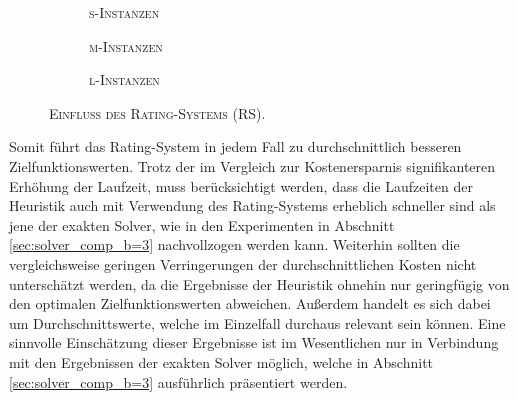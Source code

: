 \begin{figure}[H]
\centering
\begin{subfigure}[b]{0.325\textwidth}
\centering
{}
\caption{\textsc{s-Instanzen}}
\label{fig:rs_impact_a}
\end{subfigure}
\begin{subfigure}[b]{0.325\textwidth}
\centering
{}
\caption{\textsc{m-Instanzen}}
\label{fig:rs_impact_b}
\end{subfigure}
\begin{subfigure}[b]{0.325\textwidth}
\centering
{}
\caption{\textsc{l-Instanzen}}
\label{fig:rs_impact_c}
\end{subfigure}
\caption{\textsc{Einfluss des Rating-Systems (RS).}}
\label{fig:impact_of_rating_system}
\end{figure}

Somit führt das Rating-System in jedem Fall zu durchschnittlich besseren Zielfunktionswerten.
Trotz der im Vergleich zur Kostenersparnis signifikanteren Erhöhung der Laufzeit, muss berücksichtigt werden,
dass die Laufzeiten der Heuristik auch mit Verwendung des Rating-Systems erheblich schneller sind als jene der
exakten Solver, wie in den Experimenten in Abschnitt \ref{sec:solver_comp_b=3} nachvollzogen werden kann.
Weiterhin sollten die vergleichsweise geringen Verringerungen der durchschnittlichen Kosten nicht unterschätzt werden,
da die Ergebnisse der Heuristik ohnehin nur geringfügig von den optimalen Zielfunktionswerten abweichen.
Außerdem handelt es sich dabei um Durchschnittswerte, welche im Einzelfall durchaus relevant sein können.
Eine sinnvolle Einschätzung dieser Ergebnisse ist im Wesentlichen nur in Verbindung mit den Ergebnissen der exakten Solver
möglich, welche in Abschnitt \ref{sec:solver_comp_b=3} ausführlich präsentiert werden.

